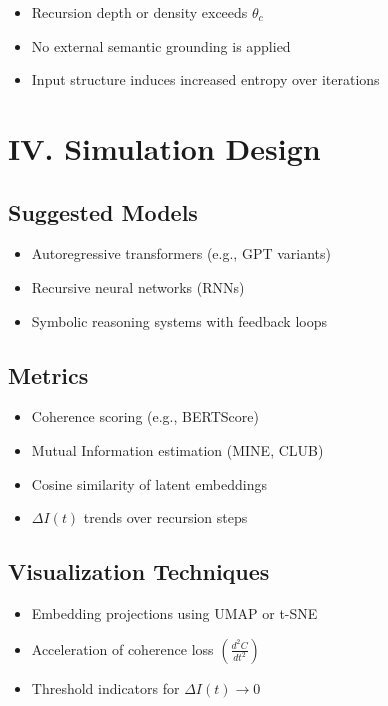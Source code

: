 \documentclass[12pt]{article}
\begin{document}
\begin{itemize}
  \item Recursion depth or density exceeds $\theta_c$
  \item No external semantic grounding is applied
  \item Input structure induces increased entropy over iterations
\end{itemize}

\section*{IV. Simulation Design}

\subsection*{Suggested Models}

\begin{itemize}
  \item Autoregressive transformers (e.g., GPT variants)
  \item Recursive neural networks (RNNs)
  \item Symbolic reasoning systems with feedback loops
\end{itemize}

\subsection*{Metrics}

\begin{itemize}
  \item Coherence scoring (e.g., BERTScore)
  \item Mutual Information estimation (MINE, CLUB)
  \item Cosine similarity of latent embeddings
  \item $\Delta I(t)$ trends over recursion steps
\end{itemize}

\subsection*{Visualization Techniques}

\begin{itemize}
  \item Embedding projections using UMAP or t-SNE
  \item Acceleration of coherence loss $\left(\frac{d^2C}{dt^2}\right)$
  \item Threshold indicators for $\Delta I(t) \rightarrow 0$
\end{itemize}
\end{document}
